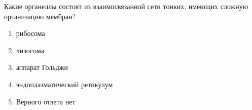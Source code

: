 
Какие органеллы состоят из взаимосвязанной сети тонких, имеющих сложную организацию мембран?

\begin{enumerate}
    \item рибосома
    \item лизосома
    \item аппарат Гольджи
    \item эндоплазматический ретикулум
    \item Верного ответа нет
\end{enumerate}

\explanationSection

